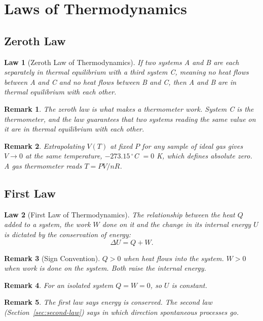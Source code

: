 \documentclass{article}
\newtheorem{law}{Law}
\newtheorem{remark}{Remark}
\begin{document}
\section{Laws of Thermodynamics}
\subsection{Zeroth Law}
\begin{law}[Zeroth Law of Thermodynamics]
    If two systems A and B are each separately in thermal equilibrium with a third system C, meaning no heat flows between A and C and no heat flows between B and C, then A and B are in thermal equilibrium with each other.
\end{law}

\begin{remark}
    The zeroth law is what makes a thermometer work. System C is the thermometer, and the law guarantees that two systems reading the same value on it are in thermal equilibrium with each other.
\end{remark}
\begin{remark}
    Extrapolating $V(T)$ at fixed $P$ for any sample of ideal gas gives $V \to 0$ at the same temperature, $-273.15\,^\circ$C $= 0$ K, which defines absolute zero. A gas thermometer reads $T = PV/nR$.
\end{remark}

\subsection{First Law}
\begin{law}[First Law of Thermodynamics]
    The relationship between the heat $Q$ added to a system, the work $W$ done on it and the change in its internal energy $U$ is dictated by the conservation of energy:
    \begin{equation}
        \label{eq:first-law}
        \Delta U = Q + W.
    \end{equation}
\end{law}

\begin{remark}[Sign Convention]
    $Q > 0$ when heat flows into the system. $W > 0$ when work is done on the system. Both raise the internal energy.
\end{remark}
\begin{remark}
    For an isolated system $Q = W = 0$, so $U$ is constant.
\end{remark}
\begin{remark}
    The first law says energy is conserved. The second law (Section~\ref{sec:second-law}) says in which direction spontaneous processes go.
\end{remark}
\end{document}
